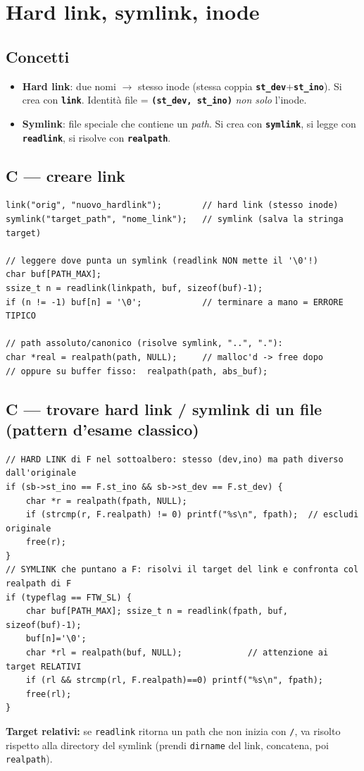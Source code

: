 \documentclass[10pt,a4paper]{article}
\newcommand{\fn}[1]{\texttt{\textbf{#1}}}
\begin{document}
\section{Hard link, symlink, inode}

\subsection{Concetti}
\begin{itemize}
\item \textbf{Hard link}: due nomi $\to$ stesso inode (stessa coppia \fn{st\_dev}+\fn{st\_ino}). Si crea con \fn{link}. Identità file = \fn{(st\_dev, st\_ino)} \emph{non solo} l'inode.
\item \textbf{Symlink}: file speciale che contiene un \emph{path}. Si crea con \fn{symlink}, si legge con \fn{readlink}, si risolve con \fn{realpath}.
\end{itemize}

\subsection{C --- creare link}
\begin{lstlisting}[style=c]
link("orig", "nuovo_hardlink");        // hard link (stesso inode)
symlink("target_path", "nome_link");   // symlink (salva la stringa target)

// leggere dove punta un symlink (readlink NON mette il '\0'!)
char buf[PATH_MAX];
ssize_t n = readlink(linkpath, buf, sizeof(buf)-1);
if (n != -1) buf[n] = '\0';            // terminare a mano = ERRORE TIPICO

// path assoluto/canonico (risolve symlink, "..", "."):
char *real = realpath(path, NULL);     // malloc'd -> free dopo
// oppure su buffer fisso:  realpath(path, abs_buf);
\end{lstlisting}

\subsection{C --- trovare hard link / symlink di un file (pattern d'esame classico)}
\begin{lstlisting}[style=c]
// HARD LINK di F nel sottoalbero: stesso (dev,ino) ma path diverso dall'originale
if (sb->st_ino == F.st_ino && sb->st_dev == F.st_dev) {
    char *r = realpath(fpath, NULL);
    if (strcmp(r, F.realpath) != 0) printf("%s\n", fpath);  // escludi originale
    free(r);
}
// SYMLINK che puntano a F: risolvi il target del link e confronta col realpath di F
if (typeflag == FTW_SL) {
    char buf[PATH_MAX]; ssize_t n = readlink(fpath, buf, sizeof(buf)-1);
    buf[n]='\0';
    char *rl = realpath(buf, NULL);             // attenzione ai target RELATIVI
    if (rl && strcmp(rl, F.realpath)==0) printf("%s\n", fpath);
    free(rl);
}
\end{lstlisting}
\textbf{Target relativi:} se \verb|readlink| ritorna un path che non inizia con \verb|/|, va risolto rispetto alla directory del symlink (prendi \verb|dirname| del link, concatena, poi \verb|realpath|).
\end{document}
